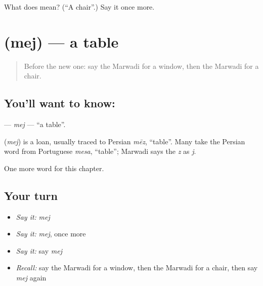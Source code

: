 \begin{tcolorbox}[breakable,colback=teal!4,colframe=teal!35!black,title={Before you move on}]
What does  mean? (\textquotedblleft{}A chair\textquotedblright{}.) Say it once more.
\end{tcolorbox}
\section[\texorpdfstring{\mw{मेज} (mej)}{मेज (mej)}]{ (mej) — a table}

\label{lesson:MW-C62-mej}



\begin{quote}
Before the new one: say the Marwadi for a window, then the Marwadi for a chair.
\end{quote}

\subsection*{You'll want to know: }
\textbf{} — \emph{mej} — \textquotedblleft{}a table\textquotedblright{}.

\begin{cousinweb}
\textbf{} (\emph{mej}) is a loan, usually traced to Persian \emph{mēz}, \textquotedblleft{}table\textquotedblright{}. Many take the Persian word from Portuguese \emph{mesa}, \textquotedblleft{}table\textquotedblright{}; Marwadi says the \emph{z} as \emph{j}.
\end{cousinweb}

\begin{grammarlens}[title={What you've built}]
One more word for this chapter.
\end{grammarlens}

\subsection*{Your turn}
\begin{itemize}
\raggedright
  \item \emph{Say it:} \emph{mej}
  \item \emph{Say it:} \emph{mej}, once more
  \item \emph{Say it:} say \emph{mej}
  \item \emph{Recall:} say the Marwadi for a window, then the Marwadi for a chair, then say \emph{mej} again
\end{itemize}

